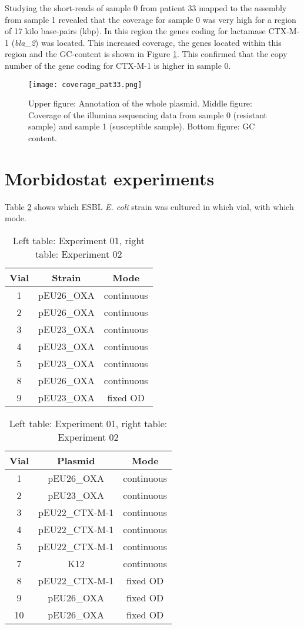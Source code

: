 Studying the short-reads of sample 0  from patient 33 mapped to the assembly from sample 1 revealed that the coverage for sample 0 was very high for a region of 17 kilo base-pairs (kbp). In this region the genes coding for \textbeta lactamase CTX-M-1 (\textit{bla\_2}) was located. This increased coverage, the genes located within this region and the GC-content is shown in Figure \ref{figure:coverage}. This confirmed that the copy number of the gene coding for CTX-M-1 is higher in sample 0.

\begin{figure}[H]
	\texttt{[image: coverage\_pat33.png]}
	\caption{Upper figure: Annotation of the whole plasmid. Middle figure: Coverage of the illumina sequencing data from sample 0 (resistant sample) and sample 1 (susceptible sample). Bottom figure: GC content.}
	\label{figure:coverage}
\end{figure}

\section{Morbidostat experiments}
Table \ref{table:vial_modes} shows which ESBL \textit{E. coli} strain was cultured in which vial, with which mode. 
\begin{table}[H]
	\begin{tabular}{|c c c|}	
		\hline
		Vial & Strain & Mode \\
		\hline
		1 & pEU26\_OXA & continuous \\
		\hline
		2 & pEU26\_OXA & continuous \\
		\hline
		3 & pEU23\_OXA & continuous \\
		\hline
		4 & pEU23\_OXA & continuous \\
		\hline
		5 & pEU23\_OXA & continuous \\
		\hline
		8 & pEU26\_OXA & continuous \\
		\hline
		9 & pEU23\_OXA & fixed OD \\
		\hline
	\end{tabular}
	\quad
	\begin{tabular}{|c c c|}	
		\hline
		Vial & Plasmid & Mode \\
		\hline
		1 & pEU26\_OXA & continuous \\
		\hline
		2 & pEU23\_OXA & continuous \\
		\hline
		3 & pEU22\_CTX-M-1 & continuous \\
		\hline
		4 & pEU22\_CTX-M-1 & continuous \\
		\hline
		5 & pEU22\_CTX-M-1 & continuous \\
		\hline
		7 & K12 & continuous \\
		\hline
		8 & pEU22\_CTX-M-1 & fixed OD \\
		\hline
		9 & pEU26\_OXA & fixed OD \\
		\hline
		10 & pEU26\_OXA & fixed OD \\
		\hline
	\end{tabular}
	\caption{Left table: Experiment 01, right table: Experiment 02}
	\label{table:vial_modes}
\end{table}
